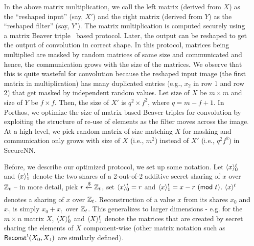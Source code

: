 In the above matrix multiplication, we call the left matrix (derived from $X$) as the ``reshaped input'' (say, $X'$) and the right matrix (derived from $Y$) as the ``reshaped filter'' (say, $Y'$). 
The matrix multiplication  is computed securely using a matrix Beaver triple~\cite{beaver,secureml} based protocol. Later, the output can be reshaped to get the output of convolution in correct shape.
In this protocol, matrices being multiplied are masked by random matrices of same size and communicated and hence, the communication grows with the size of the matrices. 
We observe that this is quite wasteful for convolution because the reshaped input image (the first matrix in multiplication) has many duplicated entries (e.g., $x_2$ in row 1 and row 2) that get masked by independent random values. 
Let size of $X$ be $m\times m$ and size of $Y$ be $f\times f$. Then, the size of $X'$ is $q^2\times f^2$, where $q = m-f+1$.
In Porthos, we optimize the size of matrix-based Beaver triples for convolution by exploiting the structure of re-use of elements as the filter moves across the image. 
At a high level, we pick random matrix of size matching $X$ for masking and communication only grows with size of $X$ (i.e., $m^2$) instead of $X'$ (i.e., $q^2f^2$) in SecureNN.

Before, we describe our optimized protocol, we set up some notation. Let $\langle x\rangle^{t}_{0}$ and $\langle x\rangle^{t}_{1}$ denote the two shares of a 2-out-of-2 additive secret sharing of $x$ over $\mathbb{Z}_t$ -- in more detail, pick $r \xleftarrow[\text{}]{\$} \mathbb{Z}_t$, set $\langle x\rangle^{t}_{0} = r$ and $\langle x\rangle^{t}_{1} = x-r\ (\mathsf{mod}\ t)$. $\langle x\rangle^{t}$ denotes a sharing of $x$ over $\mathbb{Z}_t$. 
Reconstruction of a value $x$ from its shares $x_0$ and $x_1$ is simply  $x_0+x_1$ over $\mathbb{Z}_t$.
This generalizes to larger dimensions - e.g. for the $m\times n$ matrix $X$, $\langle X\rangle^{t}_{0}$ and $\langle X\rangle^{t}_{1}$ denote the matrices that are created by secret sharing the elements of $X$ component-wise (other matrix notation such as $\mathsf{Reconst}^{t}(X_0,X_1)$ are similarly defined). 

